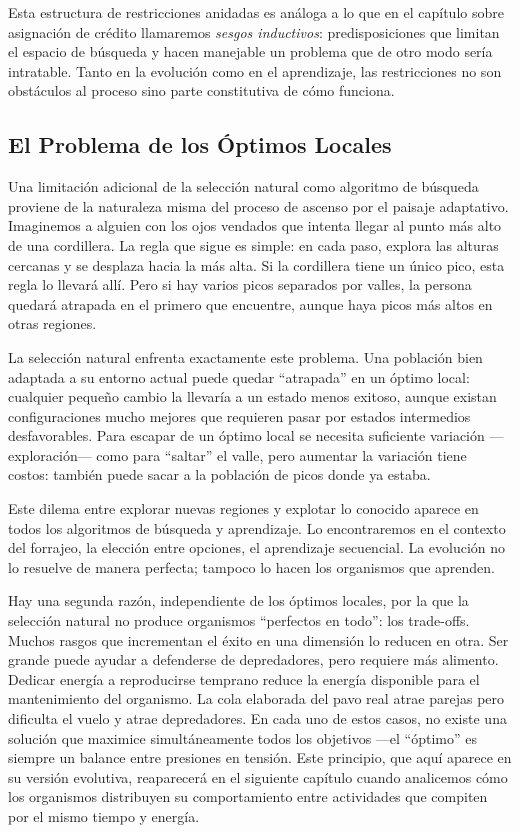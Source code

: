 \documentclass[
  letterpaper,
  DIV=11,
  numbers=noendperiod]{scrreprt}
\begin{document}
Esta estructura de restricciones anidadas es análoga a lo que en el
capítulo sobre asignación de crédito llamaremos \emph{sesgos
inductivos}: predisposiciones que limitan el espacio de búsqueda y hacen
manejable un problema que de otro modo sería intratable. Tanto en la
evolución como en el aprendizaje, las restricciones no son obstáculos al
proceso sino parte constitutiva de cómo funciona.

\subsection{El Problema de los Óptimos
Locales}\label{el-problema-de-los-uxf3ptimos-locales}

Una limitación adicional de la selección natural como algoritmo de
búsqueda proviene de la naturaleza misma del proceso de ascenso por el
paisaje adaptativo. Imaginemos a alguien con los ojos vendados que
intenta llegar al punto más alto de una cordillera. La regla que sigue
es simple: en cada paso, explora las alturas cercanas y se desplaza
hacia la más alta. Si la cordillera tiene un único pico, esta regla lo
llevará allí. Pero si hay varios picos separados por valles, la persona
quedará atrapada en el primero que encuentre, aunque haya picos más
altos en otras regiones.

La selección natural enfrenta exactamente este problema. Una población
bien adaptada a su entorno actual puede quedar ``atrapada'' en un óptimo
local: cualquier pequeño cambio la llevaría a un estado menos exitoso,
aunque existan configuraciones mucho mejores que requieren pasar por
estados intermedios desfavorables. Para escapar de un óptimo local se
necesita suficiente variación ---exploración--- como para ``saltar'' el
valle, pero aumentar la variación tiene costos: también puede sacar a la
población de picos donde ya estaba.

Este dilema entre explorar nuevas regiones y explotar lo conocido
aparece en todos los algoritmos de búsqueda y aprendizaje. Lo
encontraremos en el contexto del forrajeo, la elección entre opciones,
el aprendizaje secuencial. La evolución no lo resuelve de manera
perfecta; tampoco lo hacen los organismos que aprenden.

Hay una segunda razón, independiente de los óptimos locales, por la que
la selección natural no produce organismos ``perfectos en todo'': los
trade-offs. Muchos rasgos que incrementan el éxito en una dimensión lo
reducen en otra. Ser grande puede ayudar a defenderse de depredadores,
pero requiere más alimento. Dedicar energía a reproducirse temprano
reduce la energía disponible para el mantenimiento del organismo. La
cola elaborada del pavo real atrae parejas pero dificulta el vuelo y
atrae depredadores. En cada uno de estos casos, no existe una solución
que maximice simultáneamente todos los objetivos ---el ``óptimo'' es
siempre un balance entre presiones en tensión. Este principio, que aquí
aparece en su versión evolutiva, reaparecerá en el siguiente capítulo
cuando analicemos cómo los organismos distribuyen su comportamiento
entre actividades que compiten por el mismo tiempo y energía.
\end{document}
